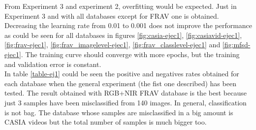 From Experiment 3 and experiment 2, overfitting would be expected. Just in Experiment 3 and with all databases except for FRAV one is obtained.\\

Decreasing the learning rate from 0.01 to 0.001 does not improve the performance as could be seen for all databases in figures \ref{fig:casia-ejec1}, \ref{fig:casiavid-ejec1}, \ref{fig:frav-ejec1}, \ref{fig:frav_imagelevel-ejec1}, \ref{fig:frav_classlevel-ejec1} and \ref{fig:mfsd-ejec1}. The  training curve should converge with more epochs, but the training and validation error is constant.\\

In table \ref{table-ej1} could be seen the positive and negatives rates obtained for each database when the general experiment (the fist one described) has been tested. The result obtained with RGB+NIR FRAV database is the best because just 3 samples have been misclassified from 140 images. In general, classification is not bag. The database whose samples are misclassified in a big amount is CASIA videos but the total number of samples is much bigger too.\\

